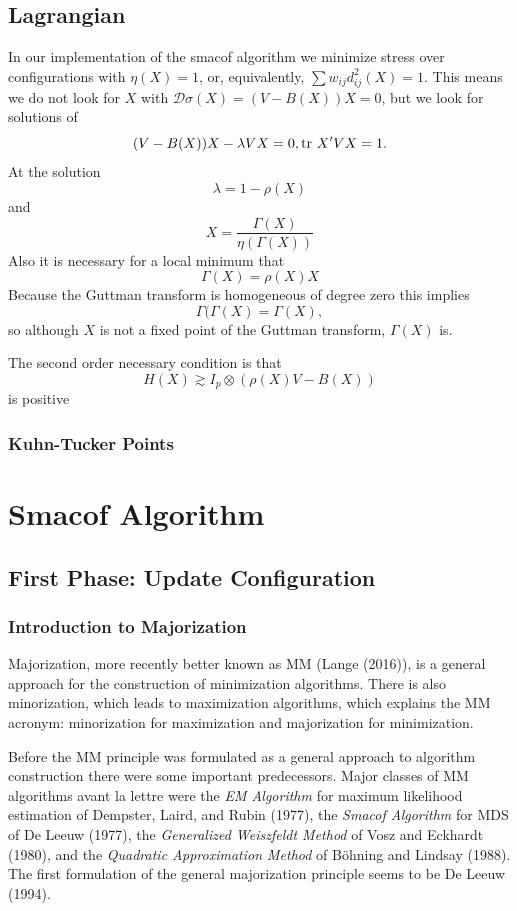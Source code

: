 \documentclass[
  12pt,
]{article}
\begin{document}
\subsection{Lagrangian}\label{lagrangian}

In our implementation of the smacof algorithm we minimize stress over configurations
with \(\eta(X)=1\), or, equivalently, \(\sum w_{ij}d_{ij}^2(X)=1\). This means we
do not look for \(X\) with \(\mathcal{D}\sigma(X)=(V-B(X))X=0\), but we look for solutions of
\[
(V-B(X))X-\lambda VX=0,\\
\text{tr}\ X'VX= 1.
\]
At the solution
\[
\lambda=1-\rho(X)
\]
and
\[
X = \frac{\Gamma(X)}{\eta(\Gamma(X))}
\]
Also it is necessary for a local minimum that
\[
\Gamma(X)=\rho(X)X
\]
Because the Guttman transform is homogeneous of degree zero this implies
\[
\Gamma(\Gamma(X)=\Gamma(X),
\]
so although \(X\) is not a fixed point of the Guttman transform, \(\Gamma(X)\) is.

The second order necessary condition is that
\[
H(X)\gtrsim I_p\otimes (\rho(X)V - B(X))
\]
is positive

\subsubsection{Kuhn-Tucker Points}\label{kuhn-tucker-points}

\section{Smacof Algorithm}\label{smacof-algorithm}

\subsection{First Phase: Update Configuration}\label{first-phase-update-configuration}

\subsubsection{Introduction to Majorization}\label{introduction-to-majorization}

Majorization, more recently better known as MM (Lange (2016)), is a general approach for the construction of minimization algorithms. There is also minorization, which leads to
maximization algorithms, which explains the MM acronym: minorization for maximization
and majorization for minimization.

Before the MM principle was formulated as a general approach to algorithm construction there were some important predecessors. Major classes of MM algorithms avant la lettre were the \emph{EM Algorithm}
for maximum likelihood estimation of Dempster, Laird, and Rubin (1977),
the \emph{Smacof Algorithm} for MDS of De Leeuw (1977),
the \emph{Generalized Weiszfeldt Method} of Vosz and Eckhardt (1980), and the \emph{Quadratic Approximation Method} of Böhning and Lindsay (1988). The first formulation of the general majorization principle
seems to be De Leeuw (1994).
\end{document}

